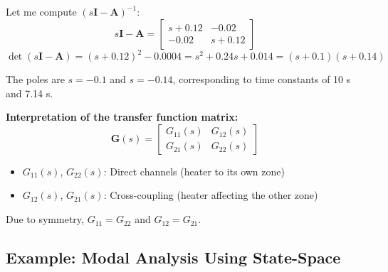 \begin{example}
Let me compute $(s\mathbf{I} - \mathbf{A})^{-1}$:
\begin{equation}
s\mathbf{I} - \mathbf{A} = \begin{bmatrix} s + 0.12 & -0.02 \\ -0.02 & s + 0.12 \end{bmatrix}
\end{equation}
\begin{equation}
\det(s\mathbf{I} - \mathbf{A}) = (s + 0.12)^2 - 0.0004 = s^2 + 0.24s + 0.014 = (s + 0.1)(s + 0.14)
\end{equation}

The poles are $s = -0.1$ and $s = -0.14$, corresponding to time constants of 10 s and 7.14 s.

\textbf{Interpretation of the transfer function matrix:}
\begin{equation}
\mathbf{G}(s) = \begin{bmatrix} G_{11}(s) & G_{12}(s) \\ G_{21}(s) & G_{22}(s) \end{bmatrix}
\end{equation}

\begin{itemize}
    \item $G_{11}(s)$, $G_{22}(s)$: Direct channels (heater to its own zone)
    \item $G_{12}(s)$, $G_{21}(s)$: Cross-coupling (heater affecting the other zone)
\end{itemize}

Due to symmetry, $G_{11} = G_{22}$ and $G_{12} = G_{21}$.
\end{example}

\subsection{Example: Modal Analysis Using State-Space}

